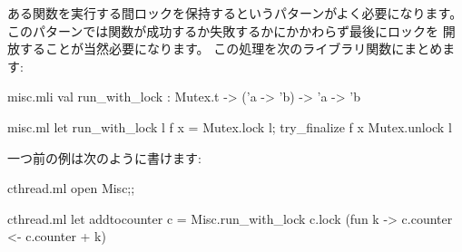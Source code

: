 ある関数を実行する間ロックを保持するというパターンがよく必要になります。
このパターンでは関数が成功するか失敗するかにかかわらず最後にロックを
開放することが当然必要になります。
この処理を次のライブラリ関数にまとめます:
\begin{codefile}{misc.mli}
val run_with_lock : Mutex.t -> ('a -> 'b) -> 'a -> 'b
\end{codefile}
\begin{listingcodefile}{misc.ml}
let run_with_lock l f x =
  Mutex.lock l; try_finalize f x Mutex.unlock l
\end{listingcodefile}
一つ前の例は次のように書けます:
\begin{codefile}{cthread.ml}
open Misc;;
\end{codefile}
\begin{listingcodefile}{cthread.ml}
let addtocounter c =
  Misc.run_with_lock c.lock (fun k -> c.counter <- c.counter + k)
\end{listingcodefile}

